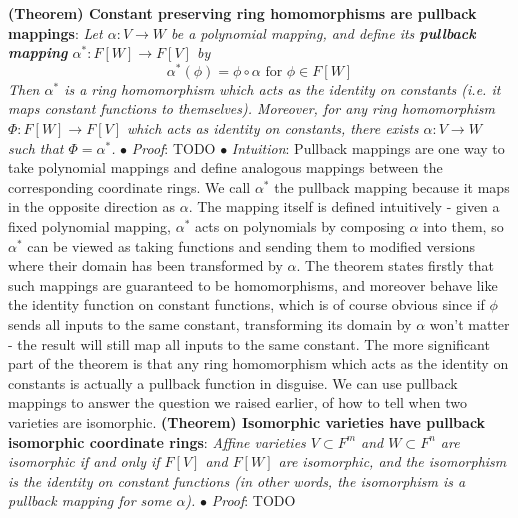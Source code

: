 \documentclass{article}
\newcommand*{\tb}{\textbf}
\newcommand*{\ti}{\textit}
\newcommand*{\n}{\newline}
\newcommand*{\nn}{\newline \newline}
\newcommand*{\Pf}{\indent \ensuremath{\bullet} \textit{Proof}: }
\newcommand*{\In}{\indent \ensuremath{\bullet} \textit{Intuition}: }
\begin{document}
\nn
\tb{(Theorem) Constant preserving ring homomorphisms are pullback mappings}: \ti{Let $ \alpha: V \rightarrow W $ be a polynomial mapping, and define its \tb{pullback mapping} $ \alpha^*: F[W] \rightarrow F[V] $ by}
$$ \alpha^*(\phi) = \phi \circ \alpha \text{ for } \phi \in F[W] $$
\indent \ti{Then $ \alpha^* $ is a ring homomorphism which acts as the identity on constants (i.e. it maps constant functions to themselves). Moreover, for any ring homomorphism $ \Phi: F[W] \rightarrow F[V] $ which acts as identity on constants, there exists $ \alpha: V \rightarrow W $ such that $ \Phi = \alpha^* $.}
\n
\Pf TODO
\n
\In Pullback mappings are one way to take polynomial mappings and define analogous mappings between the corresponding coordinate rings. We call $ \alpha^* $ the pullback mapping because it maps in the opposite direction as $ \alpha $. The mapping itself is defined intuitively - given a fixed polynomial mapping, $ \alpha^* $ acts on polynomials by composing $ \alpha $ into them, so $ \alpha^* $ can be viewed as taking functions and sending them to modified versions where their domain has been transformed by $ \alpha $. The theorem states firstly that such mappings are guaranteed to be homomorphisms, and moreover behave like the identity function on constant functions, which is of course obvious since if $ \phi $ sends all inputs to the same constant, transforming its domain by $ \alpha $ won't matter - the result will still map all inputs to the same constant.
\n
\indent The more significant part of the theorem is that any ring homomorphism which acts as the identity on constants is actually a pullback function in disguise.
\nn
We can use pullback mappings to answer the question we raised earlier, of how to tell when two varieties are isomorphic.
\nn
\tb{(Theorem) Isomorphic varieties have pullback isomorphic coordinate rings}: \ti{Affine varieties $ V \subset F^m $ and $ W \subset F^n $ are isomorphic if and only if $ F[V] $ and $ F[W] $ are isomorphic, and the isomorphism is the identity on constant functions (in other words, the isomorphism is a pullback mapping for some $ \alpha $).}
\n
\Pf TODO
\end{document}
